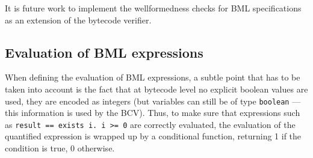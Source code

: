 It is future work to implement the wellformedness checks for BML
specifications as an extension of the bytecode verifier.
 

\subsection{Evaluation of BML expressions}

When defining the evaluation of BML expressions, a subtle point that
has to be taken into account is the fact that at bytecode level no
explicit boolean values are used, they are encoded as integers (but
variables can still be of type \texttt{boolean} --- this information is
used by the BCV). Thus, to make sure that expressions such as
\texttt{\bsl result == \bsl exists i. i >= 0} are correctly evaluated,
the evaluation of the quantified expression is wrapped up by a
conditional function, returning 1 if the condition is true, 0
otherwise.








